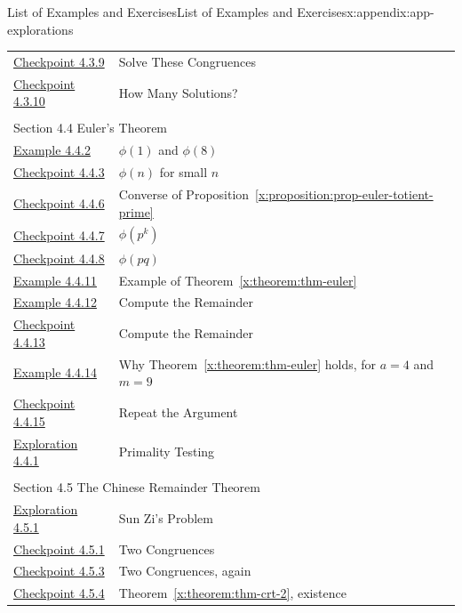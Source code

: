 \documentclass[oneside,10pt,]{book}
\newcommand{\xreffont}{\relax}
\numberwithin{equation}{section}
\begin{document}
\begin{appendixptx}{List of Examples and Exercises}{}{List of Examples and Exercises}{}{}{x:appendix:app-explorations}
\begin{longtable}[l]{ll}
\hyperref[x:exercise:ex-cong-solve-congruences]{Checkpoint 4.3.9}& Solve These Congruences\\
\hyperref[x:exercise:ex-cong-how-many-solutions]{Checkpoint 4.3.10}& How Many Solutions?\\
\multicolumn{2}{l}{\null}\\[1.5ex] \multicolumn{2}{l}{\large Section 4.4 Euler's Theorem}\\[0.5ex]
\hyperref[x:example:eg-cong-totient]{Example 4.4.2}& \(\phi(1)\) and \(\phi(8)\)\\
\hyperref[x:exercise:ex-cong-totient]{Checkpoint 4.4.3}& \(\phi(n)\) for small \(n\)\\
\hyperref[x:exercise:ex-cong-euler-totient-prime-converse]{Checkpoint 4.4.6}& Converse of Proposition~{\xreffont\ref*{x:proposition:prop-euler-totient-prime}}\\
\hyperref[x:exercise:ex-cong-euler-totient-prime-power]{Checkpoint 4.4.7}& \(\phi(p^k)\)\\
\hyperref[x:exercise:ex-cong-euler-totient-prime-product]{Checkpoint 4.4.8}& \(\phi(pq)\)\\
\hyperref[x:example:eg-cong-euler-apply]{Example 4.4.11}& Example of Theorem~{\xreffont\ref*{x:theorem:thm-euler}}\\
\hyperref[x:example:eg-cong-euler-remainder]{Example 4.4.12}& Compute the Remainder\\
\hyperref[x:exercise:ex-cong-euler-remainder]{Checkpoint 4.4.13}& Compute the Remainder\\
\hyperref[x:example:eg-cong-euler-proof-example]{Example 4.4.14}& Why Theorem~{\xreffont\ref*{x:theorem:thm-euler}} holds, for \(a = 4\) and \(m = 9\)\\
\hyperref[x:exercise:ex-cong-euler-proof-example-again]{Checkpoint 4.4.15}& Repeat the Argument\\
\hyperref[x:exploration:expl-primality-testing]{Exploration 4.4.1}& Primality Testing\\
\multicolumn{2}{l}{\null}\\[1.5ex] \multicolumn{2}{l}{\large Section 4.5 The Chinese Remainder Theorem}\\[0.5ex]
\hyperref[x:exploration:expl-sunzi]{Exploration 4.5.1}& Sun Zi's Problem\\
\hyperref[x:exercise:ex-crt-small]{Checkpoint 4.5.1}& Two Congruences\\
\hyperref[x:exercise:ex-crt-small-again]{Checkpoint 4.5.3}& Two Congruences, again\\
\hyperref[x:exercise:ex-crt-2-prove-existence]{Checkpoint 4.5.4}& Theorem~{\xreffont\ref*{x:theorem:thm-crt-2}}, existence\\

\end{longtable}
\end{appendixptx}
\end{document}
